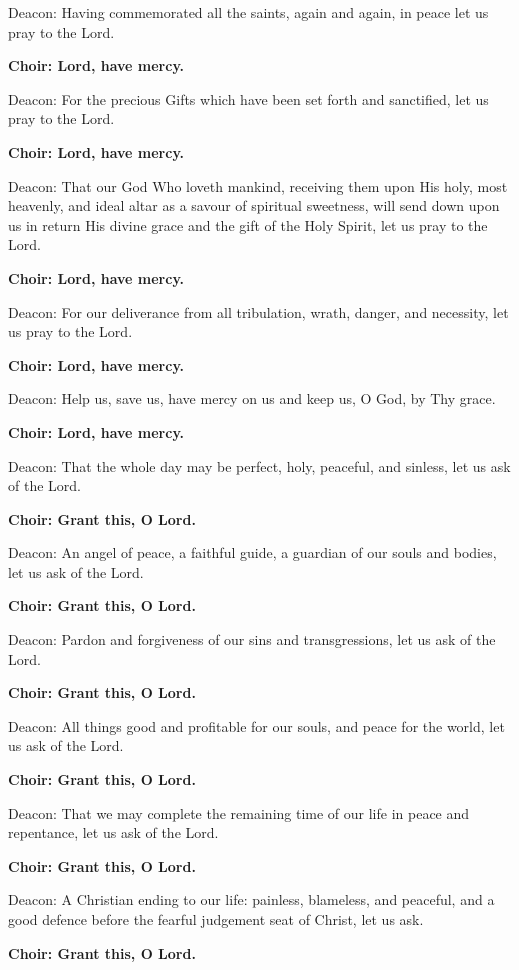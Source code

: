 \documentclass[12pt,a4paper,titlepage]{report}
\begin{document}
\begin{paracol}[1]{2}
	Deacon: Having commemorated all the saints, again and again, in peace let us pray to the Lord.
	
	\textbf{Choir: Lord, have mercy.}
	
	Deacon: For the precious Gifts which have been set forth and sanctified, let us pray to the Lord.
	
	\textbf{Choir: Lord, have mercy.}
	
	Deacon: That our God Who loveth mankind, receiving them upon His holy, most heavenly, and ideal altar as a savour of spiritual sweetness, will send down upon us in return His divine grace and the gift of the Holy Spirit, let us pray to the Lord.
	
	\textbf{Choir: Lord, have mercy.}
	
	Deacon: For our deliverance from all tribulation, wrath, danger, and necessity, let us pray to the Lord.
	
	\textbf{Choir: Lord, have mercy.}
	
	Deacon: Help us, save us, have mercy on us and keep us, O God, by Thy grace.
	
	\textbf{Choir: Lord, have mercy.}
	
	Deacon: That the whole day may be perfect, holy, peaceful, and sinless, let us ask of the Lord.
	
	\textbf{Choir: Grant this, O Lord.}
	
	Deacon: An angel of peace, a faithful guide, a guardian of our souls and bodies, let us ask of the Lord.
	
	\textbf{Choir: Grant this, O Lord.}
	
	Deacon: Pardon and forgiveness of our sins and transgressions, let us ask of the Lord.
	
	\textbf{Choir: Grant this, O Lord.}
	
	Deacon: All things good and profitable for our souls, and peace for the world, let us ask of the Lord.
	
	\textbf{Choir: Grant this, O Lord.}
	
	Deacon: That we may complete the remaining time of our life in peace and repentance, let us ask of the Lord.
	
	\textbf{Choir: Grant this, O Lord.}
	
	Deacon: A Christian ending to our life: painless, blameless, and peaceful, and a good defence before the fearful judgement seat of Christ, let us ask.
	
	\textbf{Choir: Grant this, O Lord.}
	

\end{paracol}
\end{document}
